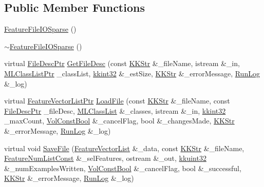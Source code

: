 \subsection*{Public Member Functions}
\begin{DoxyCompactItemize}
\item 
\hyperlink{class_k_k_m_l_l_1_1_feature_file_i_o_sparse_ad36778501bcc67859ab14717992ae7c3}{Feature\+File\+I\+O\+Sparse} ()
\item 
\hyperlink{class_k_k_m_l_l_1_1_feature_file_i_o_sparse_a9a36263cf473e131a4a9fd1365e1bfff}{$\sim$\+Feature\+File\+I\+O\+Sparse} ()
\item 
virtual \hyperlink{namespace_k_k_m_l_l_aa0d0b6ab4ec18868a399b8455b05d914}{File\+Desc\+Ptr} \hyperlink{class_k_k_m_l_l_1_1_feature_file_i_o_sparse_aece591ad2cf0bf9e3397cd9476f4a805}{Get\+File\+Desc} (const \hyperlink{class_k_k_b_1_1_k_k_str}{K\+K\+Str} \&\+\_\+file\+Name, istream \&\+\_\+in, \hyperlink{namespace_k_k_m_l_l_af091cde3f4a4315658b41a5e7583fc26}{M\+L\+Class\+List\+Ptr} \+\_\+class\+List, \hyperlink{namespace_k_k_b_a8fa4952cc84fda1de4bec1fbdd8d5b1b}{kkint32} \&\+\_\+est\+Size, \hyperlink{class_k_k_b_1_1_k_k_str}{K\+K\+Str} \&\+\_\+error\+Message, \hyperlink{class_k_k_b_1_1_run_log}{Run\+Log} \&\+\_\+log)
\item 
virtual \hyperlink{namespace_k_k_m_l_l_acf2ba92a3cf03e2b19674b24ff488ef6}{Feature\+Vector\+List\+Ptr} \hyperlink{class_k_k_m_l_l_1_1_feature_file_i_o_sparse_a131bab607d91307e872163d39f498402}{Load\+File} (const \hyperlink{class_k_k_b_1_1_k_k_str}{K\+K\+Str} \&\+\_\+file\+Name, const \hyperlink{namespace_k_k_m_l_l_aa0d0b6ab4ec18868a399b8455b05d914}{File\+Desc\+Ptr} \+\_\+file\+Desc, \hyperlink{class_k_k_m_l_l_1_1_m_l_class_list}{M\+L\+Class\+List} \&\+\_\+classes, istream \&\+\_\+in, \hyperlink{namespace_k_k_b_a8fa4952cc84fda1de4bec1fbdd8d5b1b}{kkint32} \+\_\+max\+Count, \hyperlink{namespace_k_k_b_a7d390f568e2831fb76b86b56c87bf92f}{Vol\+Const\+Bool} \&\+\_\+cancel\+Flag, bool \&\+\_\+changes\+Made, \hyperlink{class_k_k_b_1_1_k_k_str}{K\+K\+Str} \&\+\_\+error\+Message, \hyperlink{class_k_k_b_1_1_run_log}{Run\+Log} \&\+\_\+log)
\item 
virtual void \hyperlink{class_k_k_m_l_l_1_1_feature_file_i_o_sparse_a8cdcad60c4b821213cc0d71818d92c06}{Save\+File} (\hyperlink{class_k_k_m_l_l_1_1_feature_vector_list}{Feature\+Vector\+List} \&\+\_\+data, const \hyperlink{class_k_k_b_1_1_k_k_str}{K\+K\+Str} \&\+\_\+file\+Name, \hyperlink{namespace_k_k_m_l_l_ad276a9ed309552a63300bce930bdfebd}{Feature\+Num\+List\+Const} \&\+\_\+sel\+Features, ostream \&\+\_\+out, \hyperlink{namespace_k_k_b_af8d832f05c54994a1cce25bd5743e19a}{kkuint32} \&\+\_\+num\+Examples\+Written, \hyperlink{namespace_k_k_b_a7d390f568e2831fb76b86b56c87bf92f}{Vol\+Const\+Bool} \&\+\_\+cancel\+Flag, bool \&\+\_\+successful, \hyperlink{class_k_k_b_1_1_k_k_str}{K\+K\+Str} \&\+\_\+error\+Message, \hyperlink{class_k_k_b_1_1_run_log}{Run\+Log} \&\+\_\+log)
\end{DoxyCompactItemize}
